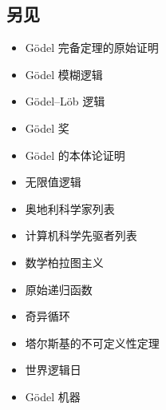 \subsection{另见}  
\begin{itemize}
\item Gödel 完备定理的原始证明  
\item Gödel 模糊逻辑  
\item Gödel–Löb 逻辑  
\item Gödel 奖  
\item Gödel 的本体论证明  
\item 无限值逻辑  
\item 奥地利科学家列表  
\item 计算机科学先驱者列表  
\item 数学柏拉图主义  
\item 原始递归函数  
\item 奇异循环  
\item 塔尔斯基的不可定义性定理  
\item 世界逻辑日  
\item Gödel 机器
\end{itemize}
